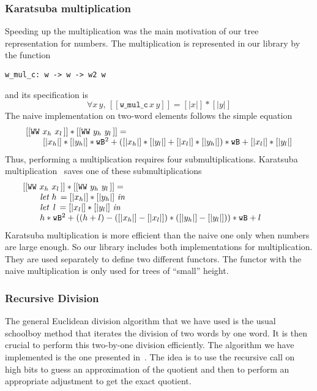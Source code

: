 \subsubsection{Karatsuba multiplication}
Speeding up the multiplication was the main motivation of our 
tree representation for numbers. The multiplication is represented in our library
by the function
\begin{verbatim}
w_mul_c: w -> w -> w2 w
\end{verbatim}
and its specification is
$$\forall x\, y,\, [[\texttt{w\_mul\_c}\, x\, y]] = [|x|] * [|y|]$$
The naive implementation on two-word elements follows the simple equation
$$\begin{array}{l}
[[\texttt{WW}\,\,x_h\,\,x_l\,]] * [[\texttt{WW}\,\,y_h\,\,y_l\,]] =\\
\hskip20pt [|{x_h}|] * [|{y_h}|] * {\texttt{wB}} ^ 2 +  ([|{x_h}|] * [|{y_l}|] + [|{x_l}|] * [|{y_h}|]) * {\texttt{wB}} + [|{x_l}|] * [|{y_l}|]
\end{array}
$$
Thus, performing a multiplication requires four submultiplications.
Karatsuba multiplication~\cite{Karat} saves one of these submultiplications
$$\begin{array}{l}
[[\texttt{WW}\,\,x_h\,\,x_l\,]] * [[\texttt{WW}\,\,y_h\,\,y_l\,]] = \\
\hskip20pt \textit{let}\,\, {h}\, = [|{x_h}|] * [|{y_h}|]\,\, \textit{in}\\
\hskip20pt \textit{let}\,\,\,  {l}\, = [|{x_l}|] * [|{y_l}|]\,\, \textit{in}\\
\hskip20pt {h} * {\texttt{wB}}^2 + (({h} + {l}) - ([|{x_h}|] - [|{x_l}|]) * ([|{y_h}|] - [|{y_l}|])) * {\texttt{wB}} + {l} \qquad\qquad
\end{array}
$$
Karatsuba multiplication is more efficient than the naive one
only when numbers are large enough. So our library
includes both implementations for multiplication. They are used separately to define two
different functors. The functor with the naive multiplication is only used 
for trees of ``small'' height. 

\subsubsection{Recursive Division}
The general Euclidean division algorithm that we have used is the usual schoolboy 
method that iterates the division of two words by one word. 
It is then crucial to perform this two-by-one division efficiently. 
The algorithm we have implemented is the one presented in~\cite{RecDiv}.
The idea is to use the recursive call on high bits to guess an approximation 
of the quotient and  then to perform an appropriate adjustment to get the exact quotient.


